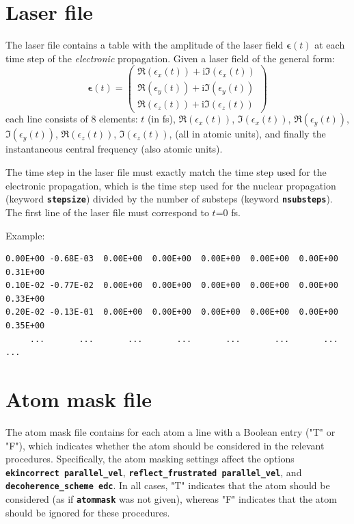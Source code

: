 \documentclass[a4paper,10pt,DIV=15,openany]{scrbook}
\newcommand{\ttt}[1]{\textbf{\texttt{#1}}}
\newcommand{\I}{\ensuremath{\mathrm{i}}}
\newenvironment{example}{
  \setlength{\OuterFrameSep}{3pt}
  \vspace{0mm}
  \definecolor{shadecolor}{HTML}{E4F4FF}
  \begin{shaded}
}{
  \end{shaded}
}
\begin{document}
\section{Laser file}\label{sec:laserfile}

The laser file contains a table with the amplitude of the laser field $\boldsymbol{\epsilon}(t)$ at each time step of the \textit{electronic} propagation. Given a laser field of the general form:
\begin{equation}
  \boldsymbol{\epsilon}(t)=
  \begin{pmatrix}
    \Re(\epsilon_x(t))+\I \Im(\epsilon_x(t))\\
    \Re(\epsilon_y(t))+\I \Im(\epsilon_y(t))\\
    \Re(\epsilon_z(t))+\I \Im(\epsilon_z(t))
  \end{pmatrix}
\end{equation}
each line consists of 8 elements: $t$ (in fs), $\Re(\epsilon_x(t))$, $\Im(\epsilon_x(t))$, $\Re(\epsilon_y(t))$, $\Im(\epsilon_y(t))$, $\Re(\epsilon_z(t))$, $\Im(\epsilon_z(t))$, (all in atomic units), and finally the instantaneous central frequency (also atomic units).

The time step in the laser file must exactly match the time step used for the electronic propagation, which is the time step used for the nuclear propagation (keyword \ttt{stepsize}) divided by the number of substeps (keyword \ttt{nsubsteps}). The first line of the laser file must correspond to $t$=0 fs.

Example:
\begin{example}
\begin{verbatim}
0.00E+00 -0.68E-03  0.00E+00  0.00E+00  0.00E+00  0.00E+00  0.00E+00  0.31E+00
0.10E-02 -0.77E-02  0.00E+00  0.00E+00  0.00E+00  0.00E+00  0.00E+00  0.33E+00
0.20E-02 -0.13E-01  0.00E+00  0.00E+00  0.00E+00  0.00E+00  0.00E+00  0.35E+00
     ...       ...       ...       ...       ...       ...       ...       ...
\end{verbatim}
\end{example}

\section{Atom mask file}\label{sec:atommaskfile}

The atom mask file contains for each atom a line with a Boolean entry ("T" or "F"), which indicates whether the atom should be considered in the relevant procedures. Specifically, the atom masking settings affect the options \ttt{ekincorrect parallel\_vel}, \ttt{reflect\_frustrated parallel\_vel}, and \ttt{decoherence\_scheme edc}.
In all cases, "T" indicates that the atom should be considered (as if \ttt{atommask} was not given), whereas "F" indicates that the atom should be ignored for these procedures.
\end{document}

